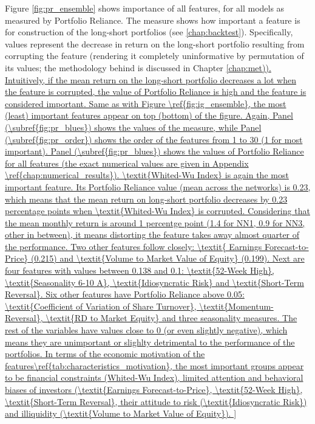 		Figure \ref{fig:pr_ensemble} shows importance of all features, for all models as measured by Portfolio Reliance. The measure shows how important a feature is for construction of the long-short portfolios (see \ref{chap:backtest}). Specifically, values represent the decrease in return on the long-short portfolio resulting from corrupting the feature (rendering it completely uninformative by permutation of its values; the methodology behind is discussed in Chapter \ref{chap:met)). Intuitively, if the mean return on the long-short portfolio decreases a lot when the feature is corrupted, the value of Portfolio Reliance is high and the feature is considered important. Same as with Figure \ref{fig:ig_ensemble}, the most (least) important features appear on top (bottom) of the figure. Again, Panel (\subref{fig:pr_blues}) shows the values of the measure, while Panel (\subref{fig:pr_order}) shows the order of the features from 1 to 30 (1 for most important). 
			
		Panel (\subref{fig:pr_blues}) shows the values of Portfolio Reliance for all features (the exact numerical values are given in Appendix \ref{chap:numerical_results}). \textit{Whited-Wu Index} is again the most important feature. Its Portfolio Reliance value (mean across the networks) is 0.23, which means that the mean return on long-short portfolio decreases by 0.23 percentage points when \textit{Whited-Wu Index} is corrupted. Considering that the mean monthly return is around 1 percentge point (1.4 for NN1, 0.9 for NN3, other in between), it means distorting the feature takes away almost quarter of the performance. Two other features follow closely: \textit{ Earnings Forecast-to-Price} (0.215) and \textit{Volume to Market Value of Equity} (0.199). Next are four features with values between 0.138 and 0.1: \textit{52-Week High}, \textit{Seasonality 6-10 A}, \textit{Idiosyncratic Risk} and \textit{Short-Term Reversal}. Six other features have Portfolio Reliance above 0.05: \textit{Coefficient of Variation of Share Turnover}, \textit{Momentum-Reversal}, \textit{RD to Market Equity} and three seasonality measures. The rest of the variables have values close to 0 (or even slightly negative), which means they are unimportant or slighlty detrimental to the performance of the portfolios. 
		
		In terms of the economic motivation of the features\ref{tab:characteristics_motivation}, the most important groups appear to be financial constraints (Whited-Wu Index), limited attention and behavioral biases of investors (\textit{Earnings Forecast-to-Price}, \textit{52-Week High}, \textit{Short-Term Reversal}, their attitude to risk (\textit{Idiosyncratic Risk}) and illiquidity (\textit{Volume to Market Value of Equity}).  
		
}
